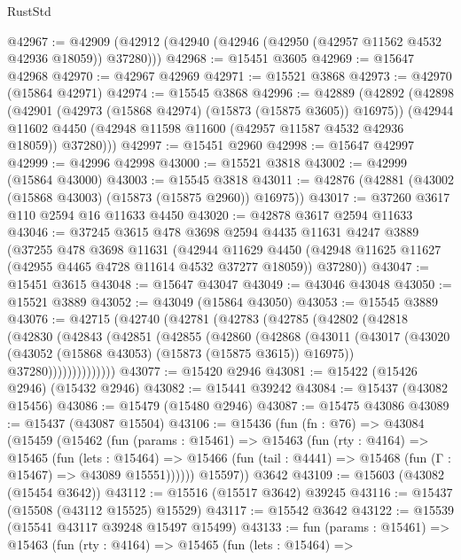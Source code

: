 \begin{lexlean}{RustStd}
\begin{coremodule}
@42967 := @42909 (@42912 (@42940 (@42946 (@42950 (@42957 @11562 @4532 @42936 @18059)) @37280)))
@42968 := @15451 @3605
@42969 := @15647 @42968
@42970 := @42967 @42969
@42971 := @15521 @3868
@42973 := @42970 (@15864 @42971)
@42974 := @15545 @3868
@42996 := @42889
    (@42892
      (@42898
        (@42901 (@42973 (@15868 @42974) (@15873 (@15875 @3605)) @16975))
        (@42944 @11602 @4450 (@42948 @11598 @11600 (@42957 @11587 @4532 @42936 @18059)) @37280)))
@42997 := @15451 @2960
@42998 := @15647 @42997
@42999 := @42996 @42998
@43000 := @15521 @3818
@43002 := @42999 (@15864 @43000)
@43003 := @15545 @3818
@43011 := @42876 (@42881 (@43002 (@15868 @43003) (@15873 (@15875 @2960)) @16975))
@43017 := @37260 @3617 @110 @2594 @16 @11633 @4450
@43020 := @42878 @3617 @2594 @11633
@43046 := @37245
    @3615
    @478
    @3698
    @2594
    @4435
    @11631
    @4247
    @3889
    (@37255
      @478
      @3698
      @11631
      (@42944
        @11629
        @4450
        (@42948 @11625 @11627 (@42955 @4465 @4728 @11614 @4532 @37277 @18059))
        @37280))
@43047 := @15451 @3615
@43048 := @15647 @43047
@43049 := @43046 @43048
@43050 := @15521 @3889
@43052 := @43049 (@15864 @43050)
@43053 := @15545 @3889
@43076 := @42715
    (@42740
      (@42781
        (@42783
          (@42785
            (@42802
              (@42818
                (@42830
                  (@42843
                    (@42851
                      (@42855
                        (@42860
                          (@42868
                            (@43011
                              (@43017
                                (@43020 (@43052 (@15868 @43053) (@15873 (@15875 @3615)) @16975))
                                @37280))))))))))))))
@43077 := @15420 @2946
@43081 := @15422 (@15426 @2946) (@15432 @2946)
@43082 := @15441 @39242
@43084 := @15437 (@43082 @15456)
@43086 := @15479 (@15480 @2946)
@43087 := @15475 @43086
@43089 := @15437 (@43087 @15504)
@43106 := @15436
    (fun (fn : @76) =>
    @43084
      (@15459
        (@15462
          (fun (params : @15461) =>
          @15463
            (fun (rty : @4164) =>
            @15465
              (fun (lets : @15464) =>
              @15466 (fun (tail : @4441) => @15468 (fun (Γ : @15467) => @43089 @15551))))))
        @15597))
    @3642
@43109 := @15603 (@43082 (@15454 @3642))
@43112 := @15516 (@15517 @3642) @39245
@43116 := @15437 (@15508 (@43112 @15525) @15529)
@43117 := @15542 @3642
@43122 := @15539 (@15541 @43117 @39248 @15497 @15499)
@43133 := fun (params : @15461) =>
  @15463
    (fun (rty : @4164) =>
    @15465
      (fun (lets : @15464) =>

\end{coremodule}
\end{lexlean}
